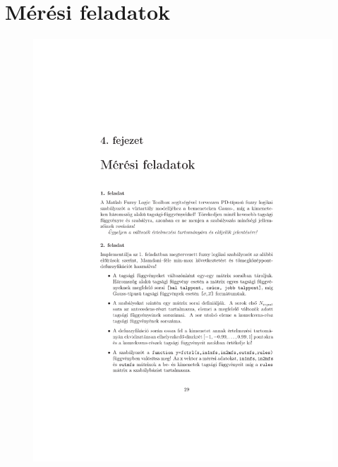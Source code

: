 \chapter{Mérési feladatok}\label{sect:LatexTools}

\begin{figure}[!ht]
	\includegraphics[trim = 40mm 60mm 40mm 100mm,clip, width=150mm,keepaspectratio]{figures/feladatok.pdf}
	\label{fig:Road-of-a-char}
\end{figure}
